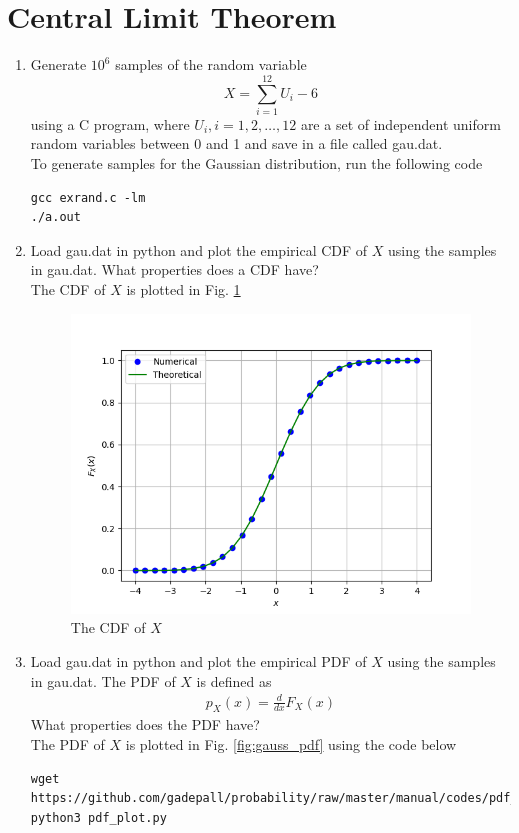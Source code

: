 \documentclass[journal,12pt,twocolumn]{IEEEtran}
\renewcommand\thesection{\arabic{section}}
\begin{document}
\section{Central Limit Theorem}
%
\begin{enumerate}[label=\thesection.\arabic*
,ref=\thesection.\theenumi]

%
\item
Generate $10^6$ samples of the random variable
%
\begin{equation}
X = \sum_{i=1}^{12}U_i -6
\end{equation}
%
using a C program, where $U_i, i = 1,2,\dots, 12$ are  a set of independent uniform random variables between 0 and 1
and save in a file called gau.dat.
\\
\solution
To generate samples for the Gaussian distribution, run the following code
\begin{lstlisting}
gcc exrand.c -lm
./a.out
\end{lstlisting}

%
\item
Load gau.dat in python and plot the empirical CDF of $X$ using the samples in gau.dat. What properties does a CDF have?
\\
\solution The CDF of $X$ is plotted in Fig. \ref{fig:gauss_cdf}
\begin{figure}
\centering
\includegraphics[width=\columnwidth]{../figs/gau_cdf.png}
\caption{The CDF of $X$}
\label{fig:gauss_cdf}
\end{figure}


\item
Load gau.dat in python and plot the empirical PDF of $X$ using the samples in gau.dat. The PDF of $X$ is defined as
\begin{align}
p_{X}(x) = \frac{d}{dx}F_{X}(x)
\end{align}
What properties does the PDF have?
\\
\solution The PDF of $X$ is plotted in Fig. \ref{fig:gauss_pdf} using the code below
\begin{lstlisting}
wget https://github.com/gadepall/probability/raw/master/manual/codes/pdf_plot.py
python3 pdf_plot.py
\end{lstlisting}


\end{enumerate}
\end{document}
